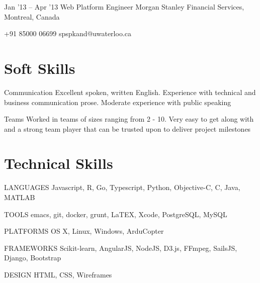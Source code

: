\documentclass{tccv}
\begin{document}
\begin{eventlist}
\item{Jan '13 -- Apr '13}
  {Web Platform Engineer}
  {Morgan Stanley Financial Services, Montreal, Canada}


\end{eventlist}



{+91 85000 06699}
{spspkand@uwaterloo.ca}
\vspace{0.4cm}

\section{Soft Skills}

\begin{factlist}
\item{Communication} {Excellent spoken, written English. Experience with technical and
    business communication prose. Moderate experience with public speaking}
\item{Teams} {Worked in teams of sizes ranging from 2 - 10. Very easy to get
    along with and a strong team player that can be trusted upon to deliver project
    milestones}
\end{factlist}
\section{Technical Skills}

\begin{factlist}
\item{LANGUAGES}
  {Javascript, R, Go, Typescript, Python, Objective-C, C, Java, MATLAB}

\item{TOOLS}
  {emacs, git, docker, grunt, LaTEX, Xcode, PostgreSQL, MySQL}

\item{PLATFORMS}
  {OS X, Linux, Windows, ArduCopter}

\item{FRAMEWORKS}
  {Scikit-learn, AngularJS, NodeJS, D3.js, FFmpeg, SailsJS, Django, Bootstrap}

\item{DESIGN}
  {HTML, CSS, Wireframes}


\end{factlist}
\end{document}
